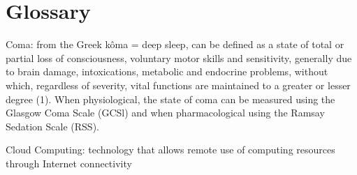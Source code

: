 \chapter{Glossary} \label{ap1:loren}

\hspace{0.5cm}Coma:
from the Greek kôma = deep sleep, can be defined as a state of total or partial loss of consciousness, voluntary motor skills and sensitivity, generally due to brain damage, intoxications, metabolic and endocrine problems, without which, regardless of severity, vital functions are maintained to a greater or lesser degree (1). When physiological, the state of coma can be measured using the Glasgow Coma Scale (GCSl) and when pharmacological using the Ramsay Sedation Scale (RSS).

Cloud Computing:
technology that allows remote use of computing resources through Internet connectivity \label{Cc}